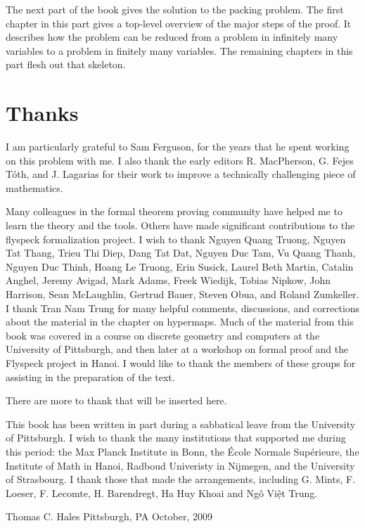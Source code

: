 The next part of the book gives the solution to the packing problem.  The first chapter in this part gives a top-level overview of the major steps of the proof.  It describes how the problem can be reduced from a problem in infinitely many variables to a problem in finitely many variables.  The remaining chapters in this part flesh out that skeleton.






\section{Thanks}

I am particularly grateful to Sam Ferguson, for the years that
he spent working on this problem with me.  I also thank the early editors
R. MacPherson, G. Fejes T\'oth, and J. Lagarias for their work
to improve a technically challenging piece of mathematics.  

Many colleagues in the formal theorem proving community have helped me to learn the theory and the tools.  Others have made significant contributions to the flyspeck formalization project.  I wish to thank 
Nguyen Quang Truong, %
Nguyen Tat Thang, %
Trieu Thi Diep, Dang Tat Dat, Nguyen Duc Tam, Vu Quang Thanh, Nguyen Duc Thinh,  Hoang Le Truong,
Erin Susick, Laurel Beth Martin, Catalin Anghel,
Jeremy Avigad, Mark Adams, Freek Wiedijk,  Tobias Nipkow, John Harrison, Sean McLaughlin, Gertrud Bauer, Steven Obua, and Roland Zumkeller.   
 I thank Tran Nam Trung for many helpful comments, discussions, and corrections about the material in the chapter on hypermaps.
Much of the material from this book was covered in a course on discrete geometry and computers at the University of Pittsburgh, and then later at a workshop on formal proof and the Flyspeck project in Hanoi.  I would like to thank the members of these groups for assisting in the preparation of the text.


\begin{note}%
There are more to thank that will be inserted here.
\end{note}

This book has been written in part during a sabbatical leave from the University of Pittsburgh.  I wish to thank the many institutions that supported
me during this period: the Max Planck Institute in Bonn, the \'Ecole Normale Sup\'erieure,  the Institute of Math
in Hanoi, Radboud Univeristy in Nijmegen, and the University of Strasbourg.
I thank those that made the arrangements, including G. Mints, F. Loeser, F. Lecomte, H. Barendregt, Ha Huy Khoai and Ng\^o Vi\d{\^e}t Trung.


\bigskip
\hbox{}



\bigskip
\hbox{}

{
\parindent=0pt
\obeylines

Thomas C. Hales
Pittsburgh, PA
October, 2009

}







